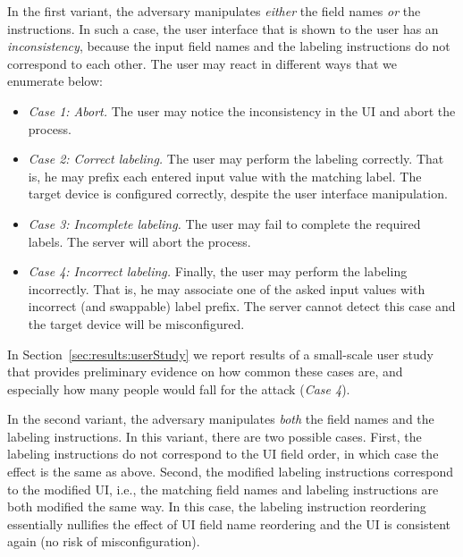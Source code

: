 In the first variant, the adversary manipulates \emph{either} the field names \emph{or} the instructions. In such a case, the user interface that is shown to the user has an \emph{inconsistency}, because the input field names and the labeling instructions do not correspond to each other. The user may react in different ways that we enumerate below:
\begin{itemize}
    \item \emph{Case 1: Abort.} The user may notice the inconsistency in the UI and abort the process. \label{detect}
    
    \item \emph{Case 2: Correct labeling.} The user may perform the labeling correctly. That is, he may prefix each entered input value with the matching label. The target device is configured correctly, despite the user interface manipulation.\label{notdetect}
    
    
    \item \emph{Case 3: Incomplete labeling.} The user may fail to complete the required labels. The server will abort the process. 
    
    \item \emph{Case 4: Incorrect labeling.} Finally, the user may perform the labeling incorrectly. That is, he may associate one of the asked input values with incorrect (and swappable) label prefix. The server cannot detect this case and the target device will be misconfigured. \label{kaboom}
\end{itemize}

In Section~\ref{sec:results:userStudy} we report results of a small-scale user study that provides preliminary evidence on how common these cases are, and especially how many people would fall for the attack (\emph{Case 4}).


In the second variant, the adversary manipulates \emph{both} the field names and the labeling instructions. In this variant, there are two possible cases. First, the labeling instructions do not correspond to the UI field order, in which case the effect is the same as above. Second, the modified labeling instructions correspond to the modified UI, i.e., the matching field names and labeling instructions are both modified the same way. In this case, the labeling instruction reordering essentially nullifies the effect of UI field name reordering and the UI is consistent again (no risk of misconfiguration).


